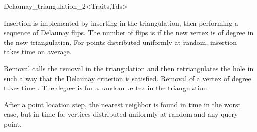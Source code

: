 \begin{ccRefClass}{Delaunay_triangulation_2<Traits,Tds>}

Insertion is implemented by inserting in the triangulation, then
performing a sequence of Delaunay flips. The number of flips is 
if the new vertex is of degree  in the new triangulation. For
points distributed uniformly at random, insertion takes time  on
average.

Removal calls the removal in the triangulation and then retriangulates
the hole in such a way that  the Delaunay criterion is satisfied. Removal of a
vertex of degree  takes time .
The degree  is  for a random
vertex in the triangulation.

After a point location step, the nearest neighbor 
is found in time  in the
worst case, but in time 
for vertices distributed uniformly at random  and any query point. 


\end{ccRefClass}


